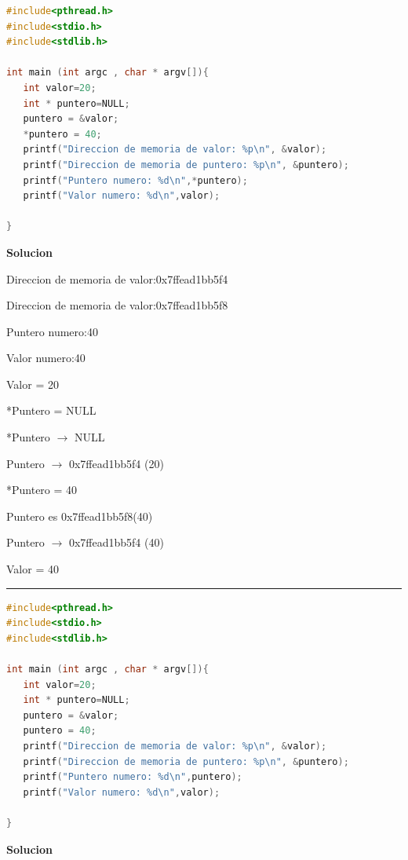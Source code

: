 \documentclass[a4paper,,onecolumn,10pt]{article}
\begin{document}
\pagecolor{gray} %
\color{blue} %

\begin{lstlisting}[language=C,basicstyle=\footnotesize, style=estilocodigo]
#include<pthread.h>
#include<stdio.h>
#include<stdlib.h>

int main (int argc , char * argv[]){
   int valor=20;
   int * puntero=NULL;
   puntero = &valor;
   *puntero = 40;
   printf("Direccion de memoria de valor: %p\n", &valor);
   printf("Direccion de memoria de puntero: %p\n", &puntero);
   printf("Puntero numero: %d\n",*puntero);
   printf("Valor numero: %d\n",valor);
   
}
\end{lstlisting}

\textbf{Solucion}

Direccion de memoria de valor:0x7ffead1bb5f4

Direccion de memoria de valor:0x7ffead1bb5f8

Puntero numero:40

Valor numero:40
\vspace{7.5mm}

Valor = 20 

*Puntero = NULL

*Puntero $\rightarrow$ NULL

Puntero $\rightarrow$ 0x7ffead1bb5f4 (20)

*Puntero = 40

Puntero es 0x7ffead1bb5f8(40) 

Puntero $\rightarrow$ 0x7ffead1bb5f4 (40)

Valor = 40 

\vspace{10mm}

{\color{RubineRed} \rule{\linewidth}{0.5mm} }


\begin{lstlisting}[language=C,basicstyle=\footnotesize, style=estilocodigo]
#include<pthread.h>
#include<stdio.h>
#include<stdlib.h>

int main (int argc , char * argv[]){
   int valor=20;
   int * puntero=NULL;
   puntero = &valor;
   puntero = 40;
   printf("Direccion de memoria de valor: %p\n", &valor);
   printf("Direccion de memoria de puntero: %p\n", &puntero);
   printf("Puntero numero: %d\n",puntero);
   printf("Valor numero: %d\n",valor);
   
}
\end{lstlisting}

\textbf{Solucion}
\end{document}

